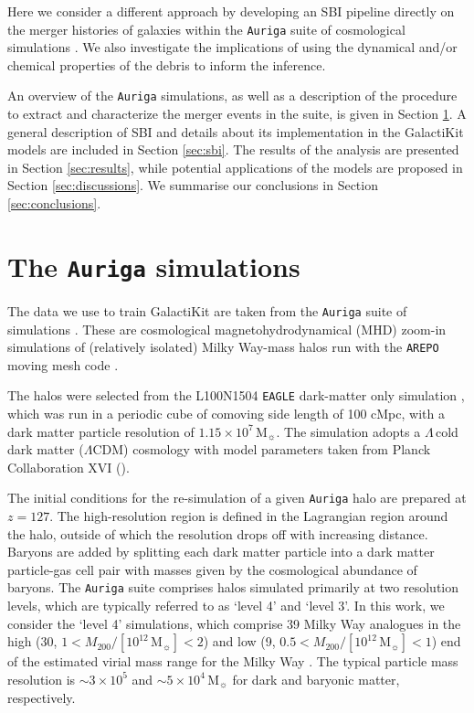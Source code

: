 Here we consider a different approach by developing an SBI pipeline directly on the merger histories of galaxies within the \texttt{Auriga} suite of cosmological simulations \citep{Grand2017,Grand2024a}. We also investigate the implications of using the dynamical and/or chemical properties of the debris to inform the inference.

An overview of the \texttt{Auriga} simulations, as well as a description of the procedure to extract and characterize the merger events in the suite, is given in Section \ref{sec:auriga_sims}. A general description of SBI and details about its implementation in the GalactiKit models are included in Section \ref{sec:sbi}. The results of the analysis are presented in Section \ref{sec:results}, while potential applications of the models are proposed in Section \ref{sec:discussions}. We summarise our conclusions in Section \ref{sec:conclusions}. 


\section{The \texttt{Auriga} simulations}
\label{sec:auriga_sims}

The data we use to train GalactiKit are taken from the \texttt{Auriga} suite of simulations \citep{Grand2017,Grand2024a}. These are cosmological magnetohydrodynamical (MHD) zoom-in simulations of (relatively isolated) Milky Way-mass halos run with the \texttt{AREPO} moving mesh code \citep{Springel2010}. 

The halos were selected from the L100N1504 \texttt{EAGLE} dark-matter only simulation \citep{Schaye2015}, which was run in a periodic cube of comoving side length of 100 cMpc, with a dark matter particle resolution of $1.15 \times 10^{7} \, \mathrm{M}_{\sun}$. The simulation adopts a $\Lambda$\,cold dark matter ($\Lambda$CDM) cosmology with model parameters taken from Planck Collaboration XVI (\citeyear{PlanckCollaboration2014}). 


The initial conditions for the re-simulation of a given \texttt{Auriga} halo are prepared at $z=127$. The high-resolution region is defined in the Lagrangian region around the halo, outside of which the resolution drops off with increasing distance. Baryons are added by splitting each dark matter particle into a dark matter particle-gas cell pair with masses given by the cosmological abundance of baryons. The \texttt{Auriga} suite comprises halos simulated primarily at two resolution levels, which are typically referred to as `level 4' and `level 3'. In this work, we consider the `level 4' simulations, which comprise 39 Milky Way analogues in the high (30, $1<M_{200}/[10^{12} \, \mathrm{M}_{\sun}]<2$) and low (9, $0.5<M_{200}/[10^{12} \, \mathrm{M}_{\sun}]<1$) end of the estimated virial mass range for the Milky Way \citep{Wang2022}. The typical particle mass resolution is $\sim 3 \times 10^{5}$ and $\sim 5 \times 10^{4} \, \mathrm{M}_{\sun}$ for dark and baryonic matter, respectively.


